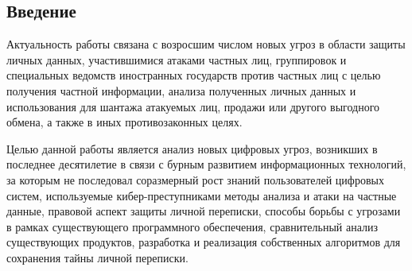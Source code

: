 \newpage
\parindent=1cm %
\begin{center}
	\section*{Введение} %
	\pagestyle{plain} %
	\setcounter{page}{3} %
\end{center}

Актуальность работы  связана с возросшим числом новых угроз в области защиты личных данных, участившимися атаками частных лиц, группировок и специальных ведомств иностранных государств против частных лиц с целью получения частной информации, анализа полученных личных данных   и использования для шантажа атакуемых лиц, продажи или другого выгодного обмена, а также  в иных противозаконных целях. 

Целью данной работы является %
 анализ новых цифровых угроз, возникших в последнее десятилетие в связи с бурным развитием информационных технологий, за которым не последовал соразмерный рост знаний пользователей цифровых систем, используемые кибер-преступниками методы анализа и атаки на частные данные, правовой аспект защиты личной переписки, способы борьбы с угрозами  в рамках существующего программного обеспечения, %
 сравнительный анализ существующих продуктов, разработка и реализация собственных алгоритмов для сохранения тайны личной переписки. 	